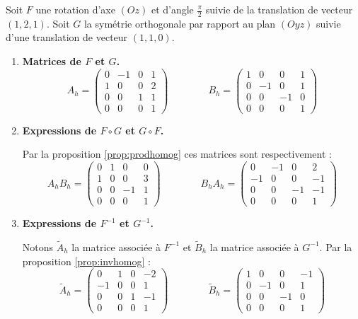 \documentclass[11pt,class=report,crop=false]{standalone}
\begin{document}
\begin{exemple}
Soit $F$ une rotation d'axe $(Oz)$ et d'angle $\frac\pi2$ suivie de la translation de vecteur $(1,2,1)$.
Soit $G$ la symétrie orthogonale par rapport au plan $(Oyz)$ suivie d'une translation de vecteur $(1,1,0)$.

\begin{enumerate}
	\item \textbf{Matrices de $F$ et $G$.}
$$A_h = 	
\begin{pmatrix}	
	0 & -1 & 0 & 1 \\
	1 & 0 & 0 & 2 \\
	0 & 0 & 1 & 1 \\
	0 & 0 & 0 & 1
\end{pmatrix}	
\qquad\qquad
B_h = 
\begin{pmatrix}	
	1 & 0 & 0 & 1 \\
	0 & -1 & 0 & 1 \\
	0 & 0 & -1 & 0 \\
	0 & 0 & 0 & 1
\end{pmatrix}$$
	
	 \item \textbf{Expressions de $F \circ G$ et $G \circ F$.}
	 
	 Par la proposition \ref{prop:prodhomog} ces matrices sont respectivement :
$$
A_hB_h = 
\begin{pmatrix}
	0 & 1 & 0 & 0 \\
	1 & 0 & 0 & 3 \\
	0 & 0 & -1 & 1 \\
	0 & 0 & 0 & 1
\end{pmatrix}
\qquad\qquad
B_h A_h = 	 
\begin{pmatrix}	 
	 0 & -1 & 0 & 2 \\
	 -1 & 0 & 0 & -1 \\
	 0 & 0 & -1 & -1 \\
	 0 & 0 & 0 & 1
\end{pmatrix}	 
$$

	 \item \textbf{Expressions de $F^{-1}$ et $G^{-1}$.}

Notons $\tilde A_h$ la matrice associée à $F^{-1}$ et $\tilde B_h$ la matrice associée à $G^{-1}$. Par la proposition \ref{prop:invhomog} :
$$		 
\tilde A_h = 
\begin{pmatrix}	
	0 & 1 & 0 & -2 \\
	-1 & 0 & 0 & 1 \\
	0 & 0 & 1 & -1 \\
	0 & 0 & 0 & 1
\end{pmatrix}
\qquad\qquad
\tilde B_h =
\begin{pmatrix}	
	1 & 0 & 0 & -1 \\
	0 & -1 & 0 & 1 \\
	0 & 0 & -1 & 0 \\
	0 & 0 & 0 & 1
\end{pmatrix}$$
	
\end{enumerate}

\end{exemple}

		 
\end{document}
